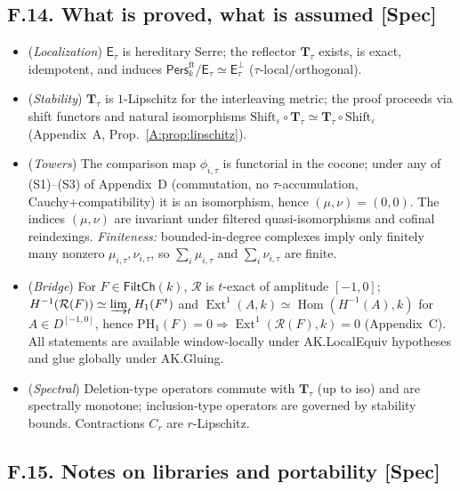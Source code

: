 \documentclass[11pt]{article}
\numberwithin{equation}{section}
\theoremstyle{plain}
\theoremstyle{definition}
\theoremstyle{remark}
\DeclareMathOperator{\Ext}{Ext}
\DeclareMathOperator{\Hom}{Hom}
\newcommand{\Pers}{\mathsf{Pers}}
\theoremstyle{plain}
\theoremstyle{definition}
\numberwithin{equation}{section}
\theoremstyle{definition}
\numberwithin{equation}{section}
\theoremstyle{plain}
\theoremstyle{definition}
\theoremstyle{remark}
\begin{document}
\subsection*{F.14. What is proved, what is assumed [Spec]}

\begin{itemize}
\item (\emph{Localization}) \(\mathsf{E}_\tau\) is hereditary Serre; the reflector \(\mathbf{T}_\tau\) exists, is exact,
idempotent, and induces \(\Pers^{\mathrm{ft}}_k/\mathsf{E}_\tau\simeq \mathsf{E}_\tau^\perp\) (\(\tau\)-local/orthogonal).
\item (\emph{Stability}) \(\mathbf{T}_\tau\) is \(1\)-Lipschitz for the interleaving metric; the proof proceeds via
shift functors and natural isomorphisms \(\mathrm{Shift}_\varepsilon\circ \mathbf{T}_\tau\simeq \mathbf{T}_\tau\circ \mathrm{Shift}_\varepsilon\) (Appendix~A, Prop.~\ref{A:prop:lipschitz}).
\item (\emph{Towers}) The comparison map \(\phi_{i,\tau}\) is functorial in the cocone; under any of (S1)–(S3)
of Appendix~D (commutation, no \(\tau\)-accumulation, Cauchy+compatibility) it is an isomorphism, hence
\((\mu,\nu)=(0,0)\). The indices \((\mu,\nu)\) are invariant under filtered quasi-isomorphisms and cofinal
reindexings. \emph{Finiteness:} bounded-in-degree complexes imply only finitely many nonzero \(\mu_{i,\tau},\nu_{i,\tau}\),
so \(\sum_i \mu_{i,\tau}\) and \(\sum_i \nu_{i,\tau}\) are finite.
\item (\emph{Bridge}) For \(F\in\mathsf{FiltCh}(k)\), \(\mathcal{R}\) is \(t\)-exact of amplitude \([-1,0]\);
\(H^{-1}(\mathcal{R}(F))\simeq \varinjlim_t H_1(F^t)\) and
\(\Ext^1(A,k)\simeq \Hom(H^{-1}(A),k)\) for \(A\in D^{[-1,0]}\), hence
\(\mathrm{PH}_1(F)=0\Rightarrow \Ext^1(\mathcal{R}(F),k)=0\) (Appendix~C). All statements are available window-locally under AK.LocalEquiv hypotheses and glue globally under AK.Gluing.
\item (\emph{Spectral}) Deletion-type operators commute with \(\mathbf{T}_\tau\) (up to iso) and are spectrally monotone; inclusion-type operators are governed by stability bounds. Contractions \(C_r\) are \(r\)-Lipschitz.
\end{itemize}

\subsection*{F.15. Notes on libraries and portability [Spec]}
\end{document}
